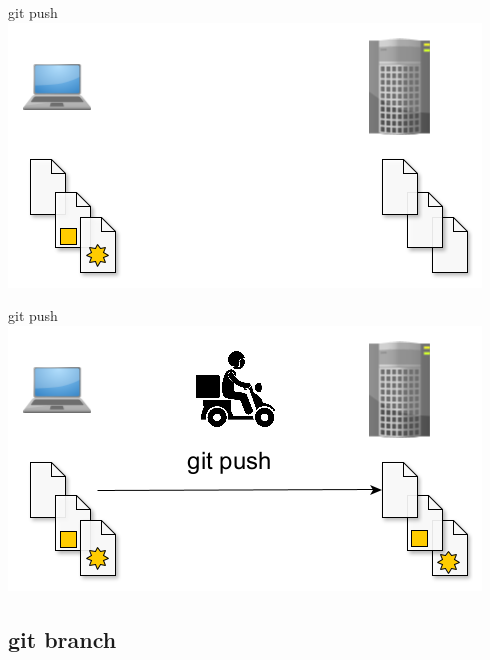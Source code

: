 \documentclass{beamer}
\begin{document}
\begin{frame}{git push}
    \centering
    \includegraphics[width=0.7\linewidth]{img/git_push_1.png}
\end{frame}
\begin{frame}{git push}
    \centering
    \includegraphics[width=0.7\linewidth]{img/git_push_2.png}
\end{frame}

\subsection{git branch}
\end{document}
